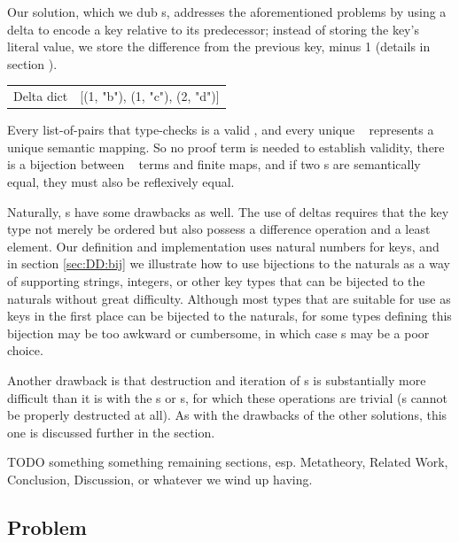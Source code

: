 Our solution, which we dub {\dd}s, addresses the aforementioned problems by using a delta to
encode a key relative to its predecessor; instead of storing the key's literal value, we store the difference
from the previous key, minus 1 (details in section ).
\\
\begin{tabular}{ l l }
 \quad\quad Delta dict & [(1, "b"), (1, "c"), (2, "d")]
\end{tabular}

Every list-of-pairs that type-checks is a valid \dd, and every unique \dd~ represents
a unique semantic mapping. So no proof term is needed to establish validity, there is a bijection between
\dd~ terms and finite maps, and if two {\dd}s are semantically equal, they must also be reflexively equal.

Naturally, {\dd}s have some drawbacks as well. The use of deltas requires that the key type not merely be
ordered but also possess a difference operation and a least element. Our definition and implementation uses
natural numbers for keys, and in section \autoref{sec:DD:bij} we illustrate how to use bijections to the
naturals as a way
of supporting strings, integers, or other key types that can be bijected to the naturals without great
difficulty. Although most types that are suitable for use as keys in the first place can be bijected to the
naturals, for some types defining this bijection may be too awkward or cumbersome, in which case {\dd}s may
be a poor choice.

Another drawback is that destruction and iteration of {\dd}s is substantially more
difficult than it is with the {\SAL}s or {\CAL}s, for which these operations are trivial
({\FPF}s cannot be properly destructed at all). As with the drawbacks of the other solutions, this one is
discussed further in the  section.

TODO something something remaining sections, esp. Metatheory, Related Work, Conclusion, Discussion, or
whatever we wind up having.


\subsection{Problem}
\label{sec:Problem}


